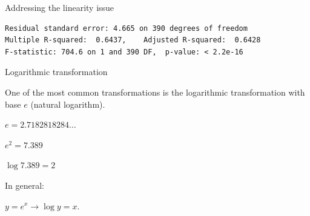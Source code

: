 \documentclass{beamer}\usepackage[]{graphicx}\usepackage[]{color}
\makeatletter
\newcommand{\hlstr}[1]{\textcolor[rgb]{1,0.894,0.71}{#1}}%
\newcommand{\hlopt}[1]{\textcolor[rgb]{1,0.894,0.769}{#1}}%
\newcommand{\hlstd}[1]{\textcolor[rgb]{1,0.894,0.769}{#1}}%
\newcommand{\hlkwc}[1]{\textcolor[rgb]{0.78,0.941,0.545}{#1}}%
\newcommand{\hlkwd}[1]{\textcolor[rgb]{1,0.78,0.769}{#1}}%
\newenvironment{kframe}{%
 \def\at@end@of@kframe{}%
 \ifinner\ifhmode%
  \def\at@end@of@kframe{\end{minipage}}%
  \begin{minipage}{\columnwidth}%
 \fi\fi%
 \def\FrameCommand##1{\hskip\@totalleftmargin \hskip-\fboxsep
 \colorbox{shadecolor}{##1}\hskip-\fboxsep
     \hskip-\linewidth \hskip-\@totalleftmargin \hskip\columnwidth}%
 \MakeFramed {\advance\hsize-\width
   \@totalleftmargin\z@ \linewidth\hsize
   \@setminipage}}%
 {\par\unskip\endMakeFramed%
 \at@end@of@kframe}
\newenvironment{knitrout}{}{} %
\makeatother
\begin{document}
\begin{darkframes}
\begin{frame}[fragile]{Addressing the linearity issue}
\begin{knitrout}
\begin{kframe}
\begin{verbatim}
Residual standard error: 4.665 on 390 degrees of freedom
Multiple R-squared:  0.6437,	Adjusted R-squared:  0.6428 
F-statistic: 704.6 on 1 and 390 DF,  p-value: < 2.2e-16
\end{verbatim}
\end{kframe}
\end{knitrout}
    \end{frame}
    
    
    
    
    
    \begin{frame}[fragile]{Logarithmic transformation}
      \begin{center}
        One of the most common transformations is the logarithmic transformation with base $e$ (natural logarithm). \bigskip \pause
        
        $e=2.7182818284\ldots$ \bigskip \pause
        
        $e^2 = 7.389$ \bigskip \pause
        
        $\log 7.389 = 2$ \bigskip \pause
        
        In general:
        
        $y=e^x \rightarrow \log y = x$.
      
      \end{center}
        
    \end{frame}
    

\end{darkframes}
\end{document}

